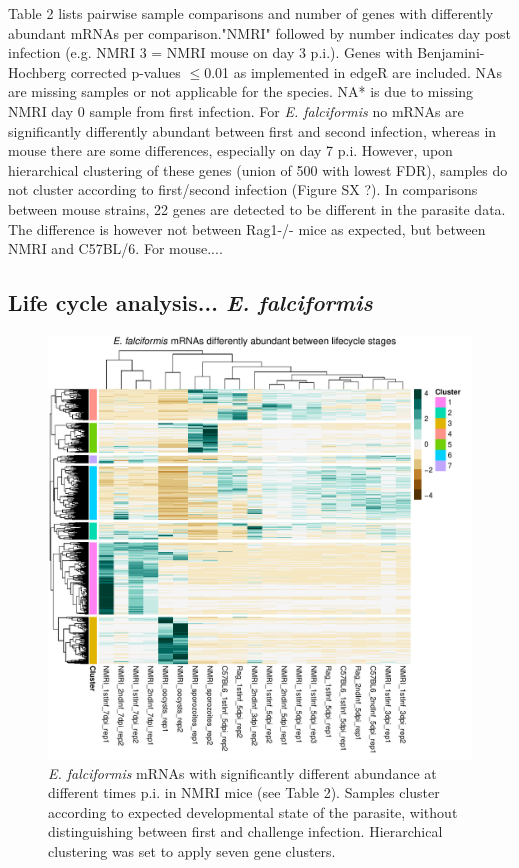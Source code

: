 \documentclass{bmcart}
\begin{document}
Table 2 lists pairwise sample comparisons and number of genes with differently abundant mRNAs per comparison."NMRI" followed by number indicates day post infection (e.g. NMRI 3 = NMRI mouse on day 3 p.i.). Genes with Benjamini-Hochberg corrected p-values $\leq$0.01 as implemented in edgeR are included. NAs are missing samples or not applicable for the species. NA* is due to missing NMRI day 0 sample from first infection. For \textit{E. falciformis} no mRNAs are significantly differently abundant between first and second infection, whereas in mouse there are some differences, especially on day 7 p.i. However, upon hierarchical clustering of these genes (union of 500 with lowest FDR), samples do not cluster according to first/second infection (Figure SX ?). In comparisons between mouse strains, 22 genes are detected to be different in the parasite data. The difference is however not between Rag1-/- mice as expected, but between NMRI and C57BL/6. For mouse....


\clearpage
\subsection{Life cycle analysis... \textit{E. falciformis}}
\begin{figure}[h!]
	\includegraphics[width=\linewidth]{EfLifecycleHeatmap.pdf}  
	\caption{\textit{E. falciformis} mRNAs with significantly different abundance at different times p.i. in NMRI mice (see Table 2). Samples cluster according to expected developmental state of the parasite, without distinguishing between first and challenge infection. Hierarchical clustering was set to apply seven gene clusters.}
\end{figure}
\end{document}
